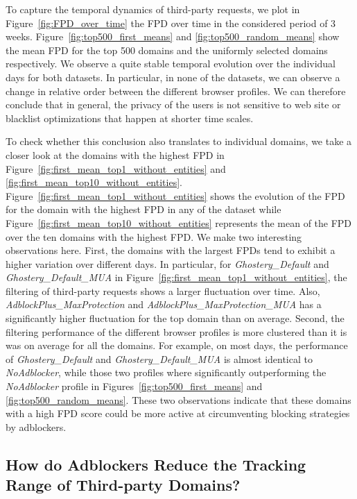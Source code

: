 \documentclass[compsoc, conference, letterpaper, 10pt, times]{IEEEtran}
\begin{document}
To capture the temporal dynamics of third-party requests, we plot in Figure~\ref{fig:FPD_over_time} the FPD over time in the considered period of 3 weeks. Figure~\ref{fig:top500_first_means} and \ref{fig:top500_random_means} show the mean FPD for the top 500 domains and the uniformly selected domains respectively. We observe a quite stable temporal evolution over the individual days for both datasets. In particular, in none of the datasets, we can observe a change in relative order between the different browser profiles. We can therefore conclude that in general, the privacy of the users is not sensitive to web site or blacklist optimizations that happen at shorter time scales.

To check whether this conclusion also translates to individual domains, we take a closer look at the domains with the highest FPD in Figure~\ref{fig:first_mean_top1_without_entities} and \ref{fig:first_mean_top10_without_entities}. Figure~\ref{fig:first_mean_top1_without_entities} shows the evolution of the FPD for the domain with the highest FPD in any of the dataset while Figure~\ref{fig:first_mean_top10_without_entities} represents the mean of the FPD over the ten domains with the highest FPD. We make two interesting observations here. First, the domains with the largest FPDs tend to exhibit a higher variation over different days. In particular, for \textit{Ghostery\_Default} and \textit{Ghostery\_Default\_MUA} in Figure~\ref{fig:first_mean_top1_without_entities}, the filtering of third-party requests shows a larger fluctuation over time. Also, \textit{AdblockPlus\_MaxProtection} and \textit{AdblockPlus\_MaxProtection\_MUA} has a significantly higher fluctuation for the top domain than on average. Second, the filtering performance of the different browser profiles is more clustered than it is was on average for all the domains. For example, on most days, the performance of \textit{Ghostery\_Default} and \textit{Ghostery\_Default\_MUA} is almost identical to \textit{NoAdblocker}, while those two profiles where significantly outperforming the \textit{NoAdblocker} profile in Figures~\ref{fig:top500_first_means} and \ref{fig:top500_random_means}. These two observations indicate that these domains with a high FPD score could be more active at circumventing blocking strategies by adblockers.

\subsection{How do Adblockers Reduce the Tracking Range of Third-party Domains?}
\end{document}
